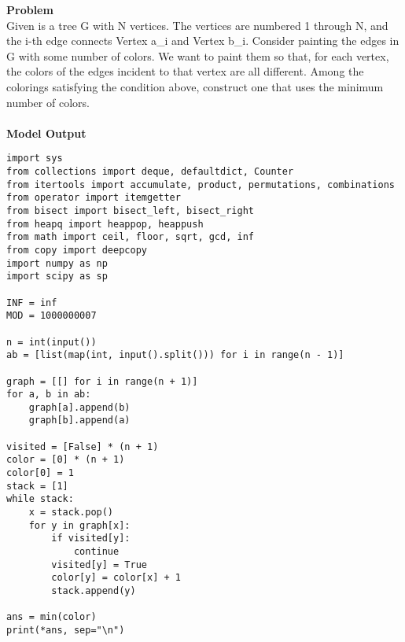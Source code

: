 \begin{figure*}
    \textbf{Problem} \\
    Given is a tree G with N vertices. The vertices are numbered 1 through N, and the i-th edge connects Vertex a\_i and Vertex b\_i. Consider painting the edges in G with some number of colors. We want to paint them so that, for each vertex, the colors of the edges incident to that vertex are all different. Among the colorings satisfying the condition above, construct one that uses the minimum number of colors.
 \\ 
 \\
 \textbf{Model Output}
 \begin{small}
 \begin{verbatim}
import sys
from collections import deque, defaultdict, Counter
from itertools import accumulate, product, permutations, combinations
from operator import itemgetter
from bisect import bisect_left, bisect_right
from heapq import heappop, heappush
from math import ceil, floor, sqrt, gcd, inf
from copy import deepcopy
import numpy as np
import scipy as sp

INF = inf
MOD = 1000000007

n = int(input())
ab = [list(map(int, input().split())) for i in range(n - 1)]

graph = [[] for i in range(n + 1)]
for a, b in ab:
    graph[a].append(b)
    graph[b].append(a)

visited = [False] * (n + 1)
color = [0] * (n + 1)
color[0] = 1
stack = [1]
while stack:
    x = stack.pop()
    for y in graph[x]:
        if visited[y]:
            continue
        visited[y] = True
        color[y] = color[x] + 1
        stack.append(y)

ans = min(color)
print(*ans, sep="\n")
\end{verbatim}
\end{small}
    \caption{An additional generated example. Here, the model output has many import statements.}
    \label{fig:supp_sample_2}
\end{figure*}


